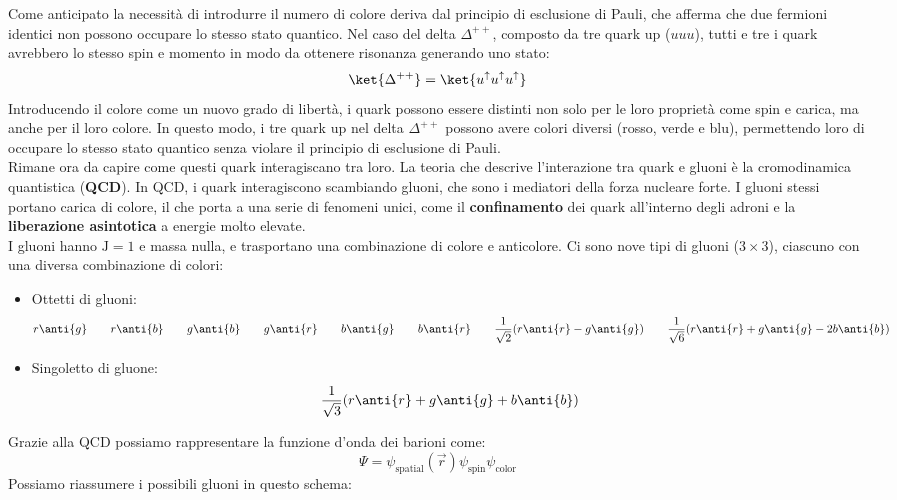 Come anticipato la necessità di introdurre il numero di colore deriva dal principio di esclusione di Pauli, che afferma che due fermioni identici non possono occupare lo stesso stato quantico. Nel caso del delta $\Delta^{++}$, composto da tre quark up ($uuu$), tutti e tre i quark avrebbero lo stesso spin e momento in modo da ottenere risonanza generando uno stato:
\begin{equation}
    \ket{\Delta^{++}} = \ket{u^\uparrow u^\uparrow u^\uparrow}
\end{equation}
Introducendo il colore come un nuovo grado di libertà, i quark possono essere distinti non solo per le loro proprietà come spin e carica, ma anche per il loro colore. In questo modo, i tre quark up nel delta $\Delta^{++}$ possono avere colori diversi (rosso, verde e blu), permettendo loro di occupare lo stesso stato quantico senza violare il principio di esclusione di Pauli.\\
Rimane ora da capire come questi quark interagiscano tra loro. La teoria che descrive l'interazione tra quark e gluoni è la cromodinamica quantistica (\textbf{QCD}). In QCD, i quark interagiscono scambiando gluoni, che sono i mediatori della forza nucleare forte. I gluoni stessi portano carica di colore, il che porta a una serie di fenomeni unici, come il \textbf{confinamento} dei quark all'interno degli adroni e la \textbf{liberazione asintotica} a energie molto elevate.\\
I gluoni hanno $\text{J} =1$ e massa nulla, e trasportano una combinazione di colore e anticolore. Ci sono nove tipi di gluoni ($3 \times 3$), ciascuno con una diversa combinazione di colori:
\begin{itemize}
    \item Ottetti di gluoni:
    \begin{equation}
        r \anti{g} \qquad r \anti{b} \qquad g \anti{b} \qquad g \anti{r} \qquad b \anti{g} \qquad b \anti{r} \qquad \dfrac{1}{\sqrt{2}} (r \anti{r} - g \anti{g}) \qquad  \dfrac{1}{\sqrt{6}} (r \anti{r} + g \anti{g} - 2 b \anti{b})
    \end{equation}
    \item Singoletto di gluone:
    \begin{equation}
        \dfrac{1}{\sqrt{3}} (r \anti{r} + g \anti{g} + b \anti{b})
    \end{equation}
\end{itemize}
Grazie alla QCD possiamo rappresentare la funzione d'onda dei barioni come:
\begin{equation}
    \Psi = \psi_{\text{spatial}}(\vec{r}) \psi_{\text{spin}}\psi_{\text{color}}
\end{equation}
Possiamo riassumere i possibili gluoni in questo schema:


